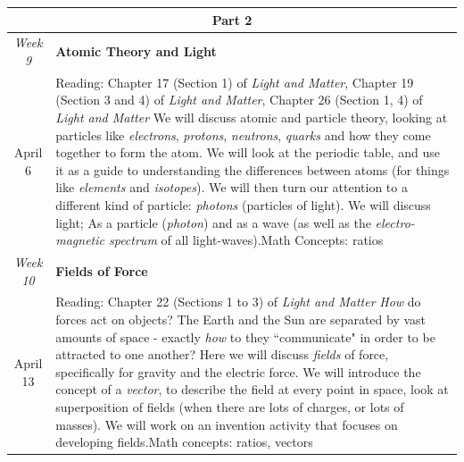 \documentclass[12pt]{article}
\begin{document}
\noindent \begin{tabularx}{\textwidth}[c]{| c X |}
\hline
	\multicolumn{2}{|c|}{\textbf{\large Part 2}} \\ \hline
	\textit{Week 9} & \textbf{Atomic Theory and Light} \\ April 6 & Reading: Chapter 17 (Section 1) of \textit{Light and Matter}, Chapter 19 (Section 3 and 4) of \textit{Light and Matter}, Chapter 26 (Section 1, 4) of \textit{Light and Matter} \newline We will discuss atomic and particle theory, looking at particles like \textit{electrons}, \textit{protons}, \textit{neutrons}, \textit{quarks} and how they come together to form the atom. We will look at the periodic table, and use it as a guide to understanding the differences between atoms (for things like \textit{elements} and \textit{isotopes}). We will then turn our attention to a different kind of particle: \textit{photons} (particles of light). We will discuss light; As a particle (\textit{photon}) and as a wave (as well as the \textit{electro-magnetic spectrum} of all light-waves).\newline Math Concepts: ratios\\ \hline
	\textit{Week 10} & \textbf{Fields of Force} \\ April 13 & Reading: Chapter 22 (Sections 1 to 3) of \textit{Light and Matter} \newline \textit{How} do forces act on objects? The Earth and the Sun are separated by vast amounts of space - exactly \textit{how} to they ``communicate" in order to be attracted to one another? Here we will discuss \textit{fields} of force, specifically for gravity and the electric force. We will introduce the concept of a \textit{vector}, to describe the field at every point in space, look at superposition of fields (when there are lots of charges, or lots of masses). We will work on an invention activity that focuses on developing fields.\newline Math concepts: ratios, vectors\\ \hline
	\end{tabularx}
\end{document}
